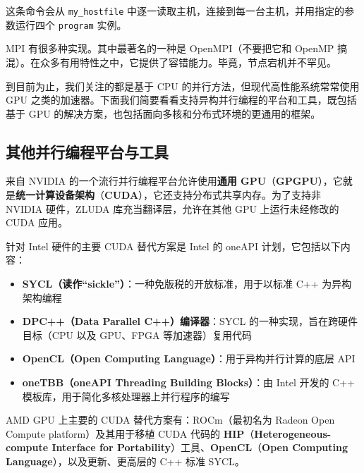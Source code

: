 
这条命令会从 \texttt{my\_\allowbreak{}hostfile} 中逐一读取主机，连接到每一台主机，并用指定的参数运行四个 \texttt{program} 实例。

MPI 有很多种实现。其中最著名的一种是 OpenMPI（不要把它和 OpenMP 搞混）。在众多有用特性之中，它提供了容错能力。毕竟，节点宕机并不罕见。

\label{idx:1248}
到目前为止，我们关注的都是基于 CPU 的并行方法，但现代高性能系统常常使用 GPU 之类的加速器。下面我们简要看看支持异构并行编程的平台和工具，既包括基于 GPU 的解决方案，也包括面向多核和分布式环境的更通用的框架。

\subsection{其他并行编程平台与工具}

\label{idx:1249}
\label{idx:1250}
\label{idx:1251}
来自 NVIDIA 的一个流行并行编程平台允许使用\textbf{通用 GPU}（\textbf{GPGPU}），它就是\textbf{统一计算设备架构}（\textbf{CUDA}），它还支持分布式共享内存。为了支持非 NVIDIA 硬件，ZLUDA 库充当翻译层，允许在其他 GPU 上运行未经修改的 CUDA 应用。

针对 Intel 硬件的主要 CUDA 替代方案是 Intel 的 oneAPI 计划，它包括以下内容：

\begin{itemize}
\item \textbf{SYCL（读作“sickle”）}：一种免版税的开放标准，用于以标准 C++ 为异构架构编程
\label{idx:1252}
\item \textbf{DPC++（Data Parallel C++）编译器}：SYCL 的一种实现，旨在跨硬件目标（CPU 以及 GPU、FPGA 等加速器）复用代码
\label{idx:1253}
\item \textbf{OpenCL（Open Computing Language）}：用于异构并行计算的底层 API
\label{idx:1254}
\item \textbf{oneTBB（oneAPI Threading Building Blocks）}：由 Intel 开发的 C++ 模板库，用于简化多核处理器上并行程序的编写
\end{itemize}

\label{idx:1255}
\label{idx:1256}
AMD GPU 上主要的 CUDA 替代方案有：ROCm（最初名为 Radeon Open Compute platform）及其用于移植 CUDA 代码的 \textbf{HIP}（\textbf{Heterogeneous-compute Interface for Portability}）工具、\textbf{OpenCL}（\textbf{Open Computing Language}），以及更新、更高层的 C++ 标准 SYCL。

